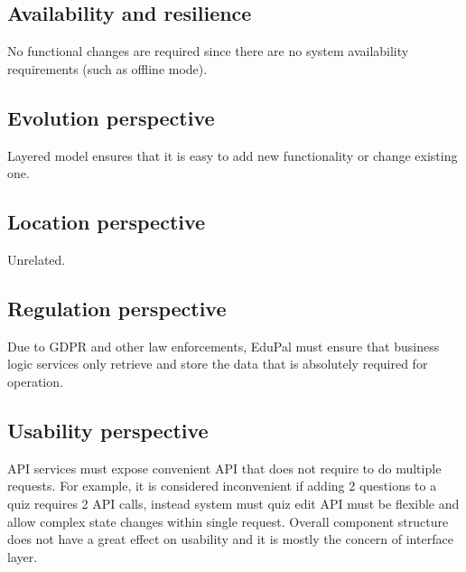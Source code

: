 \subsection{Availability and resilience}

No functional changes are required since there are no system availability requirements (such as offline mode).

\subsection{Evolution perspective}

Layered model ensures that it is easy to add new functionality or change existing one.

\subsection{Location perspective}

Unrelated.

\subsection{Regulation perspective}

Due to GDPR and other law enforcements, EduPal must ensure that business logic services only retrieve and store the data that is absolutely required for operation.

\subsection{Usability perspective}

API services must expose convenient API that does not require to do multiple requests. For example, it is considered inconvenient if adding 2 questions to a quiz requires 2 API calls, instead system must quiz edit API must be flexible and allow complex state changes within single request. Overall component structure does not have a great effect on usability and it is mostly the concern of interface layer.



